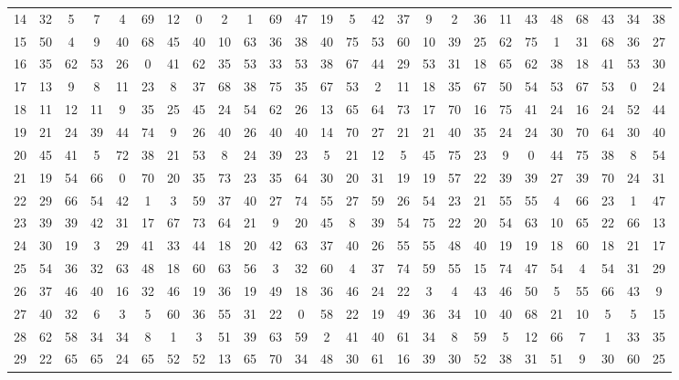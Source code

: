 \begin{table}
\begin{tabular}{c c c c c c c c c c c c c c c c c c c c c c c c c c }
14 & 32 & 5 & 7 & 4 & 69 & 12 & 0 & 2 & 1 & 69 & 47 & 19 & 5 & 42 & 37 & 9 & 2 & 36 & 11 & 43 & 48 & 68 & 43 & 34 & 38 \\
15 & 50 & 4 & 9 & 40 & 68 & 45 & 40 & 10 & 63 & 36 & 38 & 40 & 75 & 53 & 60 & 10 & 39 & 25 & 62 & 75 & 1 & 31 & 68 & 36 & 27 \\
16 & 35 & 62 & 53 & 26 & 0 & 41 & 62 & 35 & 53 & 33 & 53 & 38 & 67 & 44 & 29 & 53 & 31 & 18 & 65 & 62 & 38 & 18 & 41 & 53 & 30 \\
17 & 13 & 9 & 8 & 11 & 23 & 8 & 37 & 68 & 38 & 75 & 35 & 67 & 53 & 2 & 11 & 18 & 35 & 67 & 50 & 54 & 53 & 67 & 53 & 0 & 24 \\
18 & 11 & 12 & 11 & 9 & 35 & 25 & 45 & 24 & 54 & 62 & 26 & 13 & 65 & 64 & 73 & 17 & 70 & 16 & 75 & 41 & 24 & 16 & 24 & 52 & 44 \\
19 & 21 & 24 & 39 & 44 & 74 & 9 & 26 & 40 & 26 & 40 & 40 & 14 & 70 & 27 & 21 & 21 & 40 & 35 & 24 & 24 & 30 & 70 & 64 & 30 & 40 \\
20 & 45 & 41 & 5 & 72 & 38 & 21 & 53 & 8 & 24 & 39 & 23 & 5 & 21 & 12 & 5 & 45 & 75 & 23 & 9 & 0 & 44 & 75 & 38 & 8 & 54 \\
21 & 19 & 54 & 66 & 0 & 70 & 20 & 35 & 73 & 23 & 35 & 64 & 30 & 20 & 31 & 19 & 19 & 57 & 22 & 39 & 39 & 27 & 39 & 70 & 24 & 31 \\
22 & 29 & 66 & 54 & 42 & 1 & 3 & 59 & 37 & 40 & 27 & 74 & 55 & 27 & 59 & 26 & 54 & 23 & 21 & 55 & 55 & 4 & 66 & 23 & 1 & 47 \\
23 & 39 & 39 & 42 & 31 & 17 & 67 & 73 & 64 & 21 & 9 & 20 & 45 & 8 & 39 & 54 & 75 & 22 & 20 & 54 & 63 & 10 & 65 & 22 & 66 & 13 \\
24 & 30 & 19 & 3 & 29 & 41 & 33 & 44 & 18 & 20 & 42 & 63 & 37 & 40 & 26 & 55 & 55 & 48 & 40 & 19 & 19 & 18 & 60 & 18 & 21 & 17 \\
25 & 54 & 36 & 32 & 63 & 48 & 18 & 60 & 63 & 56 & 3 & 32 & 60 & 4 & 37 & 74 & 59 & 55 & 15 & 74 & 47 & 54 & 4 & 54 & 31 & 29 \\
26 & 37 & 46 & 40 & 16 & 32 & 46 & 19 & 36 & 19 & 49 & 18 & 36 & 46 & 24 & 22 & 3 & 4 & 43 & 46 & 50 & 5 & 55 & 66 & 43 & 9 \\
27 & 40 & 32 & 6 & 3 & 5 & 60 & 36 & 55 & 31 & 22 & 0 & 58 & 22 & 19 & 49 & 36 & 34 & 10 & 40 & 68 & 21 & 10 & 5 & 5 & 15 \\
28 & 62 & 58 & 34 & 34 & 8 & 1 & 3 & 51 & 39 & 63 & 59 & 2 & 41 & 40 & 61 & 34 & 8 & 59 & 5 & 12 & 66 & 7 & 1 & 33 & 35 \\
29 & 22 & 65 & 65 & 24 & 65 & 52 & 52 & 13 & 65 & 70 & 34 & 48 & 30 & 61 & 16 & 39 & 30 & 52 & 38 & 31 & 51 & 9 & 30 & 60 & 25 \\

\end{tabular}
\end{table}
